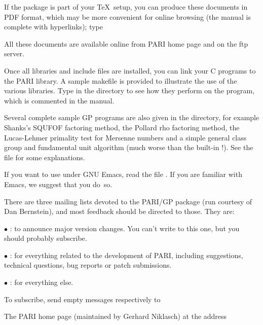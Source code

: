 \noindent If the  package is part of your \TeX\ setup, you can
produce these documents in PDF format, which may be more convenient for
online browsing (the manual is complete with hyperlinks); type


\noindent All these documents are available online from PARI home page and on
the  ftp server.

 Once all libraries and include files are installed,
you can link your C programs to the PARI library. A sample makefile
 is provided to illustrate the use of the various
libraries. Type  in the  directory to see how
they perform on the  program, which is commented in the
manual.

 Several complete sample GP programs are also given in
the  directory, for example Shanks's SQUFOF factoring method,
the Pollard rho factoring method, the Lucas-Lehmer primality test for
Mersenne numbers and a simple general class group and fundamental unit
algorithm (much worse than the built-in !). See the file
 for some explanations.

 If you want to use  under GNU Emacs, read the file
. If you are familiar with Emacs, we suggest that
you do~so.

 There are three mailing lists devoted to the
PARI/GP package (run courtesy of Dan Bernstein), and most feedback should be
directed to those. They are:

$\bullet$ : to announce major version changes.
You can't write to this one, but you should probably subscribe.

$\bullet$ : for everything related to the development
of PARI, including suggestions, technical questions, bug reports or patch
submissions.

 $\bullet$ : for everything else.

\noindent To subscribe, send empty messages respectively to

\centerline{}

\centerline{}

\centerline{}

\noindent The PARI home page (maintained by Gerhard Niklasch) at the address

